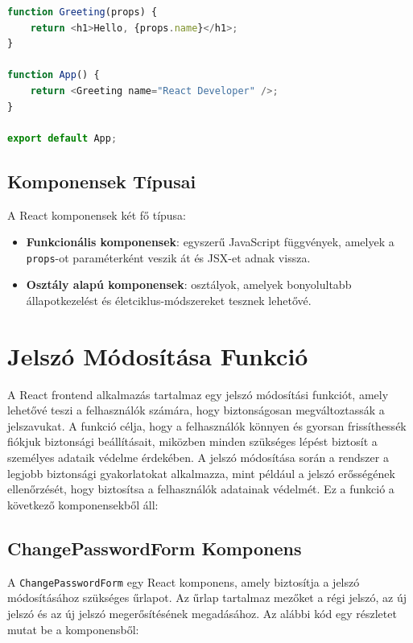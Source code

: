 \documentclass[colorlinks]{thesis-kando}
\theoremstyle{definition}
\theoremstyle{remark}
\begin{document}
\begin{lstlisting}[language = JavaScript]
function Greeting(props) {
    return <h1>Hello, {props.name}</h1>;
}

function App() {
    return <Greeting name="React Developer" />;
}

export default App;
\end{lstlisting}

\subsection{Komponensek Típusai}
A React komponensek két fő típusa:
\begin{itemize}
    \item \textbf{Funkcionális komponensek}: egyszerű JavaScript függvények, amelyek a \texttt{props}-ot paraméterként veszik át és JSX-et adnak vissza.
    \item \textbf{Osztály alapú komponensek}: osztályok, amelyek bonyolultabb állapotkezelést és életciklus-módszereket tesznek lehetővé.
\end{itemize}

\pagebreak


\section{Jelszó Módosítása Funkció}
A React frontend alkalmazás tartalmaz egy jelszó módosítási funkciót, amely lehetővé teszi a felhasználók számára, hogy biztonságosan megváltoztassák a jelszavukat. A funkció célja, hogy a felhasználók könnyen és gyorsan frissíthessék fiókjuk biztonsági beállításait, miközben minden szükséges lépést biztosít a személyes adataik védelme érdekében. A jelszó módosítása során a rendszer a legjobb biztonsági gyakorlatokat alkalmazza, mint például a jelszó erősségének ellenőrzését, hogy biztosítsa a felhasználók adatainak védelmét.
Ez a funkció a következő komponensekből áll:

\subsection{ChangePasswordForm Komponens}
A \texttt{ChangePasswordForm} egy React komponens, amely biztosítja a jelszó módosításához szükséges űrlapot. Az űrlap tartalmaz mezőket a régi jelszó, az új jelszó és az új jelszó megerősítésének megadásához. Az alábbi kód egy részletet mutat be a komponensből:
\end{document}
